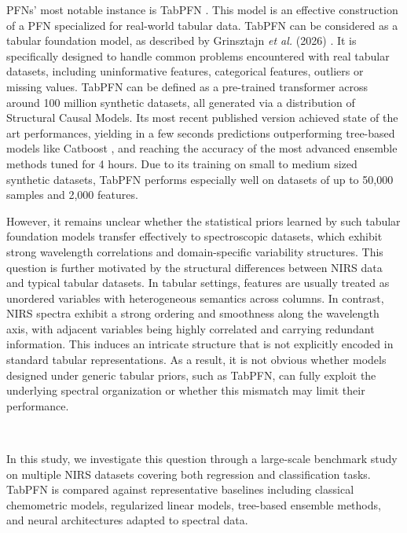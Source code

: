 \documentclass{article}
\begin{document}
PFNs' most notable instance is TabPFN \cite{hollmann_tabpfn_2023, Hollmann2025TabPFN}. This model is an effective construction of a PFN specialized for real-world tabular data. TabPFN can be considered as a tabular foundation model, as described by Grinsztajn \textit{et al.} (2026) \cite{grinsztajn_tabpfn-25_2026}. It is specifically designed to handle common problems encountered with real tabular datasets, including uninformative features, categorical features, outliers or missing values. TabPFN can be defined as a pre-trained transformer across around 100 million synthetic datasets, all generated via a distribution of Structural Causal Models. Its most recent published version \cite{grinsztajn_tabpfn-25_2026} achieved state of the art performances, yielding in a few seconds predictions outperforming tree-based models like Catboost \cite{Prokhorenkova2019CatBoost}, and reaching the accuracy of the most advanced ensemble methods \cite{Erickson2020AutoGluon} tuned for 4 hours. Due to its training on small to medium sized synthetic datasets, TabPFN performs especially well on datasets of up to 50,000 samples and 2,000 features.
~

However, it remains unclear whether the statistical priors learned by such tabular foundation models transfer effectively to spectroscopic datasets, which exhibit strong wavelength correlations and domain-specific variability structures. This question is further motivated by the structural differences between NIRS data and typical tabular datasets. In tabular settings, features are usually treated as unordered variables with heterogeneous semantics across columns. In contrast, NIRS spectra exhibit a strong ordering and smoothness along the wavelength axis, with adjacent variables being highly correlated and carrying redundant information. This induces an intricate structure that is not explicitly encoded in standard tabular representations. As a result, it is not obvious whether models designed under generic tabular priors, such as TabPFN, can fully exploit the underlying spectral organization or whether this mismatch may limit their performance.

~

In this study, we investigate this question through a large-scale benchmark study on multiple NIRS datasets covering both regression and classification tasks. TabPFN is compared against representative baselines including classical chemometric models, regularized linear models, tree-based ensemble methods, and neural architectures adapted to spectral data.
~
\end{document}
